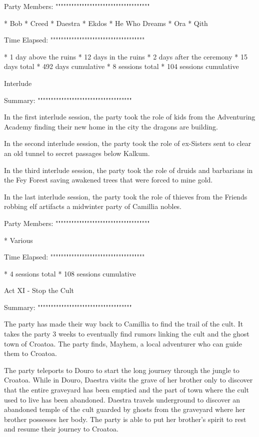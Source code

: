 Party Members:
""""""""""""""""""""""""""""""""""""

  * Bob
  * Creed
  * Daestra
  * Ekdos
  * He Who Dreams
  * Ora
  * Qith

Time Elapsed:
""""""""""""""""""""""""""""""""""""

  * 1 day above the ruins
  * 12 days in the ruins
  * 2 days after the ceremony
  * 15 days total
  * 492 days cumulative
  * 8 sessions total
  * 104 sessions cumulative

Interlude
^^^^^^^^^^^^^^^^^^^^^^^^^^^^^^^^^^^^

Summary:
""""""""""""""""""""""""""""""""""""

In the first interlude session, the party took the role of kids from the Adventuring Academy finding their new home in the city the dragons are building.

In the second interlude session, the party took the role of ex-Sisters sent to clear an old tunnel to secret passages below Kalkum.

In the third interlude session, the party took the role of druids and barbarians in the Fey Forest saving awakened trees that were forced to mine gold.

In the last interlude session, the party took the role of thieves from the Friends robbing elf artifacts a midwinter party of Camillia nobles.

Party Members:
""""""""""""""""""""""""""""""""""""

  * Various

Time Elapsed:
""""""""""""""""""""""""""""""""""""

  * 4 sessions total
  * 108 sessions cumulative

Act XI - Stop the Cult
^^^^^^^^^^^^^^^^^^^^^^^^^^^^^^^^^^^^

Summary:
""""""""""""""""""""""""""""""""""""

The party has made their way back to Camillia to find the trail of the cult.
It takes the party 3 weeks to eventually find rumors linking the cult and the ghost town of Croatoa.
The party finds, Mayhem, a local adventurer who can guide them to Croatoa.

The party teleports to Douro to start the long journey through the jungle to Croatoa.
While in Douro, Daestra visits the grave of her brother only to discover that the entire graveyard has been emptied and the part of town where the cult used to live has been abandoned.
Daestra travels underground to discover an abandoned temple of the cult guarded by ghosts from the graveyard where her brother possesses her body.
The party is able to put her brother's spirit to rest and resume their journey to Croatoa.

